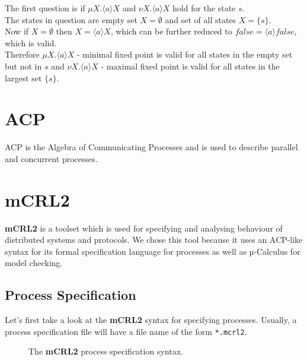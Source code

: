 \documentclass{clseminar}
\begin{document}
  \begin{center}
  \end{center}

  The first question is if $\mu X. \langle a \rangle X$ and $\nu X. \langle a \rangle X$ hold for the state $s$. \\
  The states in question are empty set $X = \emptyset$ and set of all states $X = \{s\}$. \\
  Now if $X = \emptyset$ then $X = \langle a \rangle X$, which can be further reduced to $\mathit{false} = \langle a \rangle \mathit{false}$, which is valid. \\
  Therefore $\mu X. \langle a \rangle X$ - minimal fixed point is valid for all states in the empty set but not in $s$ and $\nu X. \langle a \rangle X$ - maximal fixed point is valid for all states in the largest set $\{s\}$.

  \section{ACP}

  ACP is the Algebra of Communicating Processes and is used to describe parallel and concurrent processes.

  \cite{groote2014}

  \section{mCRL2}

  \textbf{mCRL2} is a toolset which is used for specifying and analysing behaviour of distributed systems and protocols. We chose this tool because it uses an ACP-like syntax for its formal specification language for processes as well as µ-Calculus for model checking.

  \subsection{Process Specification}

  Let's first take a look at the \textbf{mCRL2} syntax for specifying processes. Usually, a process specification file will have a file name of the form \texttt{*.mcrl2}.

  \begin{figure}[!ht]
    
    \caption{The \textbf{mCRL2} process specification syntax.}
    \label{fig:mcrl2_syntax}
  \end{figure}
\end{document}
